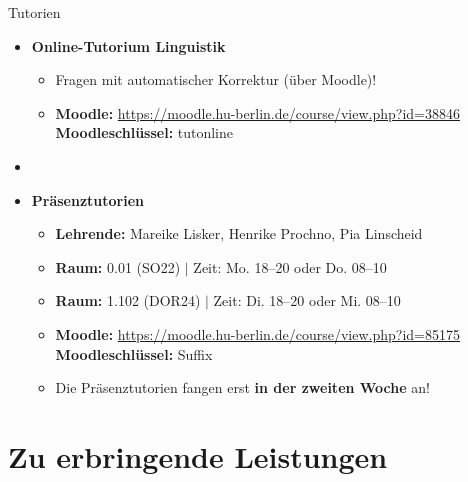 \begin{frame}{Tutorien}

	\begin{itemize}
		\item \textbf{Online-Tutorium Linguistik} 
		\begin{itemize}
			\item Fragen mit automatischer Korrektur (über Moodle)!
			\item \textbf{Moodle:} \url{https://moodle.hu-berlin.de/course/view.php?id=38846}\\
			\textbf{Moodleschlüssel:} tutonline
		\end{itemize}
		

		\item[]
		\item \textbf{Präsenztutorien}
		
		\begin{itemize}
			\item \textbf{Lehrende:} Mareike Lisker, Henrike Prochno, Pia Linscheid
			\item \textbf{Raum:} 0.01 (SO22) $|$ Zeit: Mo. 18--20 oder Do. 08--10
			\item \textbf{Raum:} 1.102 (DOR24) $|$ Zeit: Di. 18--20 oder Mi. 08--10
			\item \textbf{Moodle:} \url{https://moodle.hu-berlin.de/course/view.php?id=85175}\\
				\textbf{Moodleschlüssel:} Suffix
			\item Die Präsenztutorien fangen erst \textbf{in der zweiten Woche} an!
		\end{itemize}
		
	\end{itemize}
	
\end{frame}


\section{Zu erbringende Leistungen}

